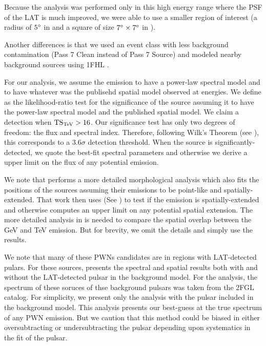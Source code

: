 Because the analysis was performed only in this high energy range where
the \ac{PSF} of the \ac{LAT} is much improved, we were able to use
a smaller region of interest (a radius of $5^\circ$ in \pointlike 
and a square of size $7^\circ\times7^\circ$ in \gtlike).

Another differences is that we used an event class with less background
contamination (Pass 7 Clean instead of Pass 7 Source) and modeled
nearby background sources using \ac{1FHL} \citep{ackermann_2013a_first-fermi-lat}.

For our analysis, we assume the \gev emission to have a power-law spectral
model and to have whatever was the publisehd spatial model observed at
\tev energies.  We define \tstev as the likelihood-ratio test for the
significance of the source assuming it to have the power-law spectral
model and the published \tev spatial model.  We claim a detection
when $\mathrm{TS}_\text{TeV} > 16$.  Our significance test has only two degrees of freedom:
the flux and spectral index.  Therefore, following Wilk's Theorem (see
), this corresponds to a $3.6\sigma$
detection threshold. When the source is significantly-detected, we quote
the best-fit spectral parameters and otherwise we derive a upper limit
on the flux of any potential emission.

We note that \cite{acero_2013a_constraints-galactic} performs a more
detailed morphological analysis which also fits the positions of the
sources assuming their emissions to be point-like and spatially-extended.
That work then uses \tsext (See ) to test
if the emission is spatially-extended and otherwise computes an upper
limit on any potential spatial extension.  The more detailed analysis in
\cite{acero_2013a_constraints-galactic} is needed to compare the spatial
overlap between the GeV and TeV emission. But for brevity, we omit the
details and simply use the results.

We note that many of these \acp{PWN} candidates are
in regions with \ac{LAT}-detected pulars.  For these sources,
\cite{acero_2013a_constraints-galactic} presents the spectral and
spatial results both with and without the \ac{LAT}-detected pulsar in the
background model. For the analysis, the spectrum of these soruces of thse
background pulsars was taken from the \ac{2FGL} catalog.  For simplicity,
we present only the analysis with the pulsar included in the background
model. This analysis presents our best-guess at the true spectrum of
any \ac{PWN} emission.  But we caution that this method could be biased
in either oversubtracting or undersubtracting the pulsar depending upon
systematics in the fit of the pulsar.

